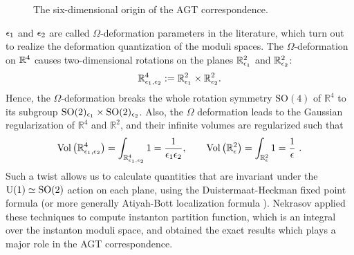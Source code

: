 \begin{figure}
  \centering
    \def\height{1.2cm}
  \caption{The six-dimensional origin of the AGT correspondence.}
  \label{fig:AGT}
\end{figure}




$\epsilon_1$ and $\epsilon_2$ are
called $\Omega$-deformation parameters in the literature, which turn out
to realize the deformation quantization of the moduli spaces.
The $\Omega$-deformation on $\mathbb{R}^4$ causes
two-dimensional rotations on the planes $\mathbb R^2_{\epsilon_1}$ and $\mathbb R^2_{\epsilon_2}$:
\begin{equation}
    \mathbb{R}^4_{\epsilon_1,\epsilon_2} := \mathbb{R}^2_{\epsilon_1} \times \mathbb{R}^2_{\epsilon_2}.
\end{equation}
Hence, the $\Omega$-deformation breaks the whole rotation symmetry $\mathrm{SO}(4)$ of $\mathbb R^4$ to
its subgroup $\mathrm{SO}(2)_{\epsilon_1}\times\mathrm{SO}(2)_{\epsilon_2}$.
Also, the $\Omega$ deformation leads to the Gaussian regularization of $\mathbb R^4$ and $\mathbb R^2$,
and their infinite volumes are regularized such that
\begin{equation}
    \rm{Vol}\left(  \mathbb{R}^4_{\epsilon_1,\epsilon_2}  \right) = \int_{\mathbb{R}^4_{\epsilon_1,\epsilon_2}}1 = \frac{1}{\epsilon_1 \epsilon_2} ,
    \qquad
    \rm{Vol}\left(  \mathbb{R}^2_{\epsilon}  \right) = \int_{\mathbb{R}^2_{\epsilon}}1 = \frac{1}{\epsilon}
    ~ .
\end{equation}
Such a twist allows us to calculate quantities that are invariant under the $\mathrm{U}(1) \simeq \mathrm{SO}(2)$
action on each plane, using the Duistermaat-Heckman fixed point formula
\cite{Duistermaat:1982vw} (or more generally Atiyah-Bott localization formula \cite{Atiyah:1984px}).
Nekrasov applied these techniques to compute instanton partition function, which is an integral over
the instanton moduli space, and obtained the exact results \cite{Nekrasov:2002qd,Nekrasov:2003rj}
which plays a major role in the AGT correspondence.

